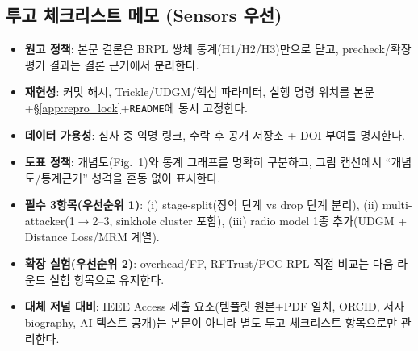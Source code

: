 \documentclass[12pt,a4paper]{article}
\begin{document}
\subsection{투고 체크리스트 메모 (Sensors 우선)}
\label{app:submission_memo}

\begin{itemize}
  \item \textbf{원고 정책}: 본문 결론은 BRPL 쌍체 통계(H1/H2/H3)만으로 닫고,
    precheck/확장 평가 결과는 결론 근거에서 분리한다.
  \item \textbf{재현성}: 커밋 해시, Trickle/UDGM/핵심 파라미터, 실행 명령 위치를
    본문+\S\ref{app:repro_lock}+\texttt{README}에 동시 고정한다.
  \item \textbf{데이터 가용성}: 심사 중 익명 링크, 수락 후 공개 저장소 + DOI 부여를 명시한다.
  \item \textbf{도표 정책}: 개념도(Fig.~1)와 통계 그래프를 명확히 구분하고,
    그림 캡션에서 ``개념도/통계근거'' 성격을 혼동 없이 표시한다.
  \item \textbf{필수 3항목(우선순위 1)}:
    (i) stage-split(장악 단계 vs drop 단계 분리),
    (ii) multi-attacker(1$\rightarrow$2--3, sinkhole cluster 포함),
    (iii) radio model 1종 추가(UDGM + Distance Loss/MRM 계열).
  \item \textbf{확장 실험(우선순위 2)}: overhead/FP, RFTrust/PCC-RPL 직접 비교는
    다음 라운드 실험 항목으로 유지한다.
  \item \textbf{대체 저널 대비}: IEEE Access 제출 요소(템플릿 원본+PDF 일치,
    ORCID, 저자 biography, AI 텍스트 공개)는 본문이 아니라
    별도 투고 체크리스트 항목으로만 관리한다.
\end{itemize}




\end{document}
